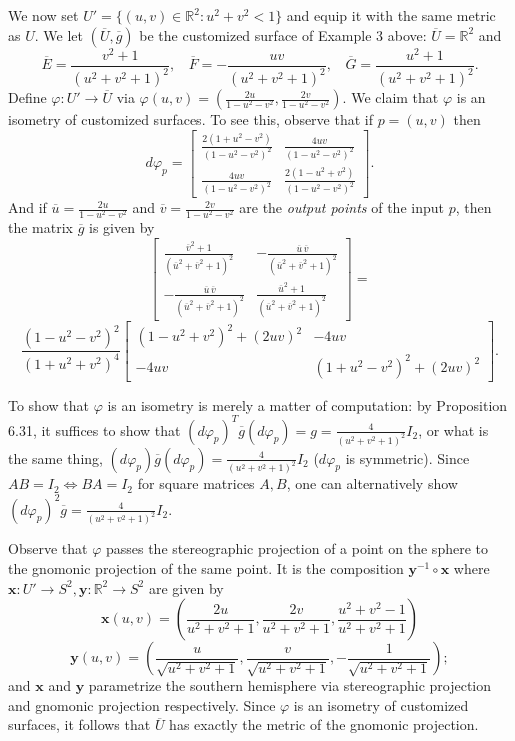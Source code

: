 \documentclass[leqno]{book}
\begin{document}
We now set $U'=\{(u,v)\in\mathbb R^2:u^2+v^2<1\}$ and equip it with the same metric as $U$.  We let $(\overline U,\overline g)$ be the customized surface of Example 3 above: $\overline U=\mathbb R^2$ and
$$\overline E=\frac{v^2+1}{(u^2+v^2+1)^2},~~~~\overline F=-\frac{uv}{(u^2+v^2+1)^2},~~~~\overline G=\frac{u^2+1}{(u^2+v^2+1)^2}.$$
Define $\varphi:U'\to\overline U$ via $\varphi(u,v)=\left(\frac{2u}{1-u^2-v^2},\frac{2v}{1-u^2-v^2}\right)$.  We claim that $\varphi$ is an isometry of customized surfaces.  To see this, observe that if $p=(u,v)$ then
$$d\varphi_p=\begin{bmatrix}\frac{2(1+u^2-v^2)}{(1-u^2-v^2)^2}&\frac{4uv}{(1-u^2-v^2)^2}\\\frac{4uv}{(1-u^2-v^2)^2}&\frac{2(1-u^2+v^2)}{(1-u^2-v^2)^2}\end{bmatrix}.$$
And if $\overline u=\frac{2u}{1-u^2-v^2}$ and $\overline v=\frac{2v}{1-u^2-v^2}$ are the \emph{output points} of the input $p$, then the matrix $\overline g$ is given by
$$\begin{bmatrix}\frac{\overline v^2+1}{(\overline u^2+\overline v^2+1)^2}&-\frac{\overline u\,\overline v}{(\overline u^2+\overline v^2+1)^2}\\-\frac{\overline u\,\overline v}{(\overline u^2+\overline v^2+1)^2}&\frac{\overline u^2+1}{(\overline u^2+\overline v^2+1)^2}\end{bmatrix}=$$
$$\frac{(1-u^2-v^2)^2}{(1+u^2+v^2)^4}\begin{bmatrix}(1-u^2+v^2)^2+(2uv)^2&-4uv\\-4uv&(1+u^2-v^2)^2+(2uv)^2\end{bmatrix}.$$

To show that $\varphi$ is an isometry is merely a matter of  computation: by Proposition 6.31, it suffices to show that $(d\varphi_p)^T\overline g(d\varphi_p)=g=\frac 4{(u^2+v^2+1)^2}I_2$, or what is the same thing, $(d\varphi_p)\overline g(d\varphi_p)=\frac 4{(u^2+v^2+1)^2}I_2$ ($d\varphi_p$ is symmetric).  Since $AB=I_2\iff BA=I_2$ for square matrices $A,B$, one can alternatively show $(d\varphi_p)^2\overline g=\frac 4{(u^2+v^2+1)^2}I_2$.

Observe that $\varphi$ passes the stereographic projection of a point on the sphere to the gnomonic projection of the same point.  It is the composition $\mathbf y^{-1}\circ\mathbf x$ where $\mathbf x:U'\to S^2,\mathbf y:\mathbb R^2\to S^2$ are given by
$$\mathbf x(u,v)=\left(\frac{2u}{u^2+v^2+1},\frac{2v}{u^2+v^2+1},\frac{u^2+v^2-1}{u^2+v^2+1}\right)$$
$$\mathbf y(u,v)=\left(\frac u{\sqrt{u^2+v^2+1}},\frac v{\sqrt{u^2+v^2+1}},-\frac 1{\sqrt{u^2+v^2+1}}\right);$$
and $\mathbf x$ and $\mathbf y$ parametrize the southern hemisphere via stereographic projection and gnomonic projection respectively.  Since $\varphi$ is an isometry of customized surfaces, it follows that $\overline U$ has exactly the metric of the gnomonic projection.\\
\end{document}
